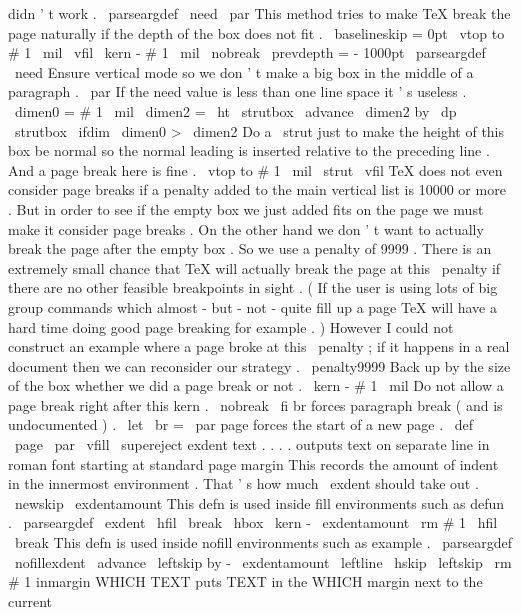 didn
'
t
work
.
%
\
parseargdef
\
need
{
\
par
%
%
%
This
method
tries
to
make
TeX
break
the
page
naturally
%
%
if
the
depth
of
the
box
does
not
fit
.
%
{
\
baselineskip
=
0pt
%
%
\
vtop
to
#
1
\
mil
{
\
vfil
}
\
kern
-
#
1
\
mil
\
nobreak
%
\
prevdepth
=
-
1000pt
%
}
}
\
parseargdef
\
need
{
%
%
Ensure
vertical
mode
so
we
don
'
t
make
a
big
box
in
the
middle
of
a
%
paragraph
.
\
par
%
%
If
the
need
value
is
less
than
one
line
space
it
'
s
useless
.
\
dimen0
=
#
1
\
mil
\
dimen2
=
\
ht
\
strutbox
\
advance
\
dimen2
by
\
dp
\
strutbox
\
ifdim
\
dimen0
>
\
dimen2
%
%
Do
a
\
strut
just
to
make
the
height
of
this
box
be
normal
so
the
%
normal
leading
is
inserted
relative
to
the
preceding
line
.
%
And
a
page
break
here
is
fine
.
\
vtop
to
#
1
\
mil
{
\
strut
\
vfil
}
%
%
%
TeX
does
not
even
consider
page
breaks
if
a
penalty
added
to
the
%
main
vertical
list
is
10000
or
more
.
But
in
order
to
see
if
the
%
empty
box
we
just
added
fits
on
the
page
we
must
make
it
consider
%
page
breaks
.
On
the
other
hand
we
don
'
t
want
to
actually
break
the
%
page
after
the
empty
box
.
So
we
use
a
penalty
of
9999
.
%
%
There
is
an
extremely
small
chance
that
TeX
will
actually
break
the
%
page
at
this
\
penalty
if
there
are
no
other
feasible
breakpoints
in
%
sight
.
(
If
the
user
is
using
lots
of
big
group
commands
which
%
almost
-
but
-
not
-
quite
fill
up
a
page
TeX
will
have
a
hard
time
doing
%
good
page
breaking
for
example
.
)
However
I
could
not
construct
an
%
example
where
a
page
broke
at
this
\
penalty
;
if
it
happens
in
a
real
%
document
then
we
can
reconsider
our
strategy
.
\
penalty9999
%
%
Back
up
by
the
size
of
the
box
whether
we
did
a
page
break
or
not
.
\
kern
-
#
1
\
mil
%
%
Do
not
allow
a
page
break
right
after
this
kern
.
\
nobreak
\
fi
}
%
br
forces
paragraph
break
(
and
is
undocumented
)
.
\
let
\
br
=
\
par
%
page
forces
the
start
of
a
new
page
.
%
\
def
\
page
{
\
par
\
vfill
\
supereject
}
%
exdent
text
.
.
.
.
%
outputs
text
on
separate
line
in
roman
font
starting
at
standard
page
margin
%
This
records
the
amount
of
indent
in
the
innermost
environment
.
%
That
'
s
how
much
\
exdent
should
take
out
.
\
newskip
\
exdentamount
%
This
defn
is
used
inside
fill
environments
such
as
defun
.
\
parseargdef
\
exdent
{
\
hfil
\
break
\
hbox
{
\
kern
-
\
exdentamount
{
\
rm
#
1
}
}
\
hfil
\
break
}
%
This
defn
is
used
inside
nofill
environments
such
as
example
.
\
parseargdef
\
nofillexdent
{
{
\
advance
\
leftskip
by
-
\
exdentamount
\
leftline
{
\
hskip
\
leftskip
{
\
rm
#
1
}
}
}
}
%
inmargin
{
WHICH
}
{
TEXT
}
puts
TEXT
in
the
WHICH
margin
next
to
the
current
%
